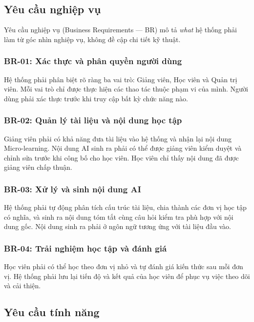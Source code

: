 \subsection{Yêu cầu nghiệp vụ}

Yêu cầu nghiệp vụ (Business Requirements --- BR) mô tả \textit{what} hệ
thống phải làm từ góc nhìn nghiệp vụ, không đề cập chi tiết kỹ thuật.

\subsubsection{BR-01: Xác thực và phân quyền người dùng}

Hệ thống phải phân biệt rõ ràng ba vai trò: Giảng viên, Học viên và Quản
trị viên. Mỗi vai trò chỉ được thực hiện các thao tác thuộc phạm vi của mình.
Người dùng phải xác thực trước khi truy cập bất kỳ chức năng nào.

\subsubsection{BR-02: Quản lý tài liệu và nội dung học tập}

Giảng viên phải có khả năng đưa tài liệu vào hệ thống và nhận lại nội dung
Micro-learning. Nội dung AI sinh ra phải có thể được giảng viên kiểm duyệt
và chỉnh sửa trước khi công bố cho học viên. Học viên chỉ thấy nội dung đã
được giảng viên chấp thuận.

\subsubsection{BR-03: Xử lý và sinh nội dung AI}

Hệ thống phải tự động phân tích cấu trúc tài liệu, chia thành các đơn vị
học tập có nghĩa, và sinh ra nội dung tóm tắt cùng câu hỏi kiểm tra phù hợp
với nội dung gốc. Nội dung sinh ra phải ở ngôn ngữ tương ứng với tài liệu
đầu vào.

\subsubsection{BR-04: Trải nghiệm học tập và đánh giá}

Học viên phải có thể học theo đơn vị nhỏ và tự đánh giá kiến thức sau mỗi
đơn vị. Hệ thống phải lưu lại tiến độ và kết quả của học viên để phục vụ
việc theo dõi và cải thiện.

\subsection{Yêu cầu tính năng}

